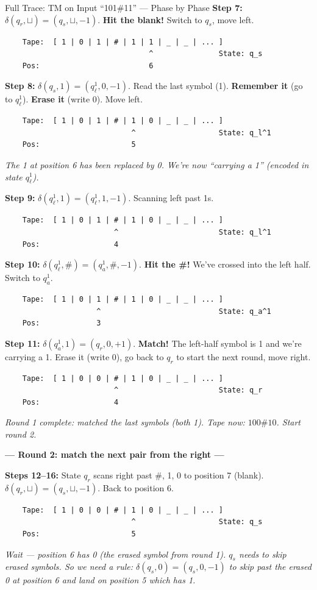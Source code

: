 \documentclass[11pt,a4paper]{article}
\begin{document}
\begin{examplebox}{Full Trace: TM on Input ``101\#11'' --- Phase by Phase}
\textbf{Step 7:} $\delta(q_r, \sqcup) = (q_s, \sqcup, -1)$. \textbf{Hit the blank!} Switch to $q_s$, move left.
\begin{lstlisting}
    Tape:  [ 1 | 0 | 1 | # | 1 | 1 | _ | _ | ... ]
                                 ^               State: q_s
    Pos:                         6
\end{lstlisting}

\textbf{Step 8:} $\delta(q_s, 1) = (q_\ell^1, 0, -1)$. Read the last symbol (1). \textbf{Remember it} (go to $q_\ell^1$). \textbf{Erase it} (write 0). Move left.
\begin{lstlisting}
    Tape:  [ 1 | 0 | 1 | # | 1 | 0 | _ | _ | ... ]
                             ^                   State: q_l^1
    Pos:                     5
\end{lstlisting}
\textit{The 1 at position 6 has been replaced by 0. We're now ``carrying a 1'' (encoded in state $q_\ell^1$).}

\textbf{Step 9:} $\delta(q_\ell^1, 1) = (q_\ell^1, 1, -1)$. Scanning left past 1s.
\begin{lstlisting}
    Tape:  [ 1 | 0 | 1 | # | 1 | 0 | _ | _ | ... ]
                         ^                       State: q_l^1
    Pos:                 4
\end{lstlisting}

\textbf{Step 10:} $\delta(q_\ell^1, \#) = (q_a^1, \#, -1)$. \textbf{Hit the \#!} We've crossed into the left half. Switch to $q_a^1$.
\begin{lstlisting}
    Tape:  [ 1 | 0 | 1 | # | 1 | 0 | _ | _ | ... ]
                     ^                           State: q_a^1
    Pos:             3
\end{lstlisting}

\textbf{Step 11:} $\delta(q_a^1, 1) = (q_r, 0, +1)$. \textbf{Match!} The left-half symbol is 1 and we're carrying a 1. Erase it (write 0), go back to $q_r$ to start the next round, move right.
\begin{lstlisting}
    Tape:  [ 1 | 0 | 0 | # | 1 | 0 | _ | _ | ... ]
                         ^                       State: q_r
    Pos:                 4
\end{lstlisting}
\textit{Round 1 complete: matched the last symbols (both 1). Tape now: $100\#10$. Start round 2.}

\textbf{--- Round 2: match the next pair from the right ---}

\textbf{Steps 12--16:} State $q_r$ scans right past $\#$, 1, 0 to position 7 (blank). $\delta(q_r, \sqcup) = (q_s, \sqcup, -1)$. Back to position 6.
\begin{lstlisting}
    Tape:  [ 1 | 0 | 0 | # | 1 | 0 | _ | _ | ... ]
                             ^                   State: q_s
    Pos:                     5
\end{lstlisting}
\textit{Wait --- position 6 has 0 (the erased symbol from round 1). $q_s$ needs to skip erased symbols. So we need a rule: $\delta(q_s, 0) = (q_s, 0, -1)$ to skip past the erased 0 at position 6 and land on position 5 which has 1.}


\end{examplebox}
\end{document}
